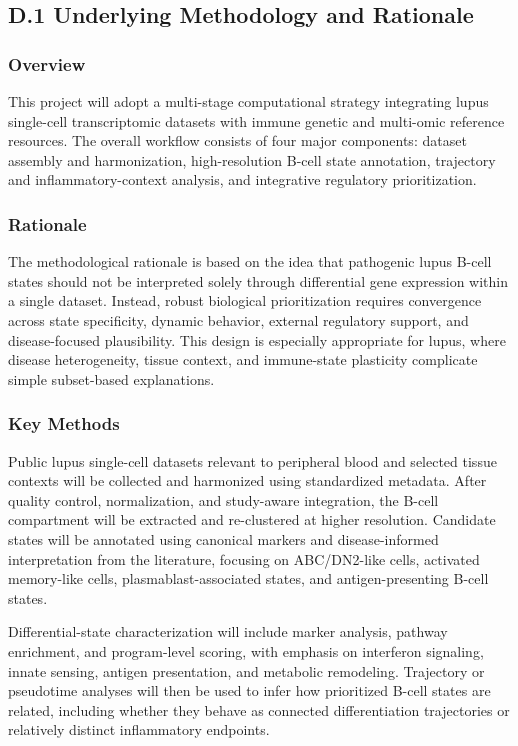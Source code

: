 \subsection*{D.1 Underlying Methodology and Rationale}

\subsubsection*{Overview}
This project will adopt a multi-stage computational strategy integrating lupus single-cell transcriptomic datasets with immune genetic and multi-omic reference resources. The overall workflow consists of four major components: dataset assembly and harmonization, high-resolution B-cell state annotation, trajectory and inflammatory-context analysis, and integrative regulatory prioritization.

\subsubsection*{Rationale}
The methodological rationale is based on the idea that pathogenic lupus B-cell states should not be interpreted solely through differential gene expression within a single dataset. Instead, robust biological prioritization requires convergence across state specificity, dynamic behavior, external regulatory support, and disease-focused plausibility. This design is especially appropriate for lupus, where disease heterogeneity, tissue context, and immune-state plasticity complicate simple subset-based explanations.

\subsubsection*{Key Methods}
Public lupus single-cell datasets relevant to peripheral blood and selected tissue contexts will be collected and harmonized using standardized metadata. After quality control, normalization, and study-aware integration, the B-cell compartment will be extracted and re-clustered at higher resolution. Candidate states will be annotated using canonical markers and disease-informed interpretation from the literature, focusing on ABC/DN2-like cells, activated memory-like cells, plasmablast-associated states, and antigen-presenting B-cell states.

Differential-state characterization will include marker analysis, pathway enrichment, and program-level scoring, with emphasis on interferon signaling, innate sensing, antigen presentation, and metabolic remodeling. Trajectory or pseudotime analyses will then be used to infer how prioritized B-cell states are related, including whether they behave as connected differentiation trajectories or relatively distinct inflammatory endpoints.

